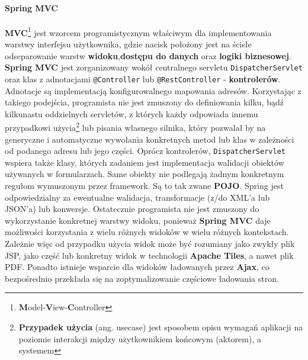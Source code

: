 	\paragraph{Spring MVC}
	\label{app:spring_mvc}
	\textbf{MVC}\footnote{\textbf{M}odel-\textbf{V}iew-\textbf{C}ontroller} jest wzorcem programistycznym 
	właściwym dla implementowania warstwy interfejsu użytkownika, gdzie nacisk położony 
	jest na ścisłe odseparowanie warstw \textbf{widoku},\textbf{dostępu do danych} oraz 
	\textbf{logiki biznesowej}. \textbf{Spring MVC} jest zorganizowany wokół 
	centralnego servletu \texttt{DispatcherServlet} oraz klas z adnotacjami 
	\texttt{@Controller} lub \texttt{@RestController} - \textbf{kontrolerów}. 
	Adnotacje są implementacją konfigurowalnego mapowania adresów. Korzystając 
	z takiego podejścia, programista nie jest zmuszony do definiowania kilku, 
	bądź kilkunastu oddzielnych servletów, z których każdy odpowiada innemu 
	przypadkowi użycia\footnote{\textbf{Przypadek użycia} (ang. usecase) jest sposobem 
	opisu wymagań aplikacji na poziomie interakcji między użytkownikiem końcowym 
	(aktorem), a systemem} lub pisania własnego silnika, który pozwalał by na generyczne 
	i automatyczne wywołania konkretnych metod lub klas w zależności od podanego adresu lub jego części. 
	Oprócz kontrolerów, \texttt{DispatcherServlet} wspiera także klasy, których 
	zadaniem jest implementacja walidacji obiektów używanych w formularzach. 
	Same obiekty nie podlegają żadnym konkretnym regułom wymuszonym przez framework. 
	Są to tak zwane \textbf{POJO}. Spring jest odpowiedzialny za ewentualne walidacja, transformacje (z/do XML'a lub JSON'a) lub konwersje. 
	Ostatecznie programista nie jest zmuszony do wykorzystanie konkretnej warstwy 
	widoku, ponieważ \textbf{Spring MVC} daje możliwości korzystania z wielu 
	różnych widoków w wielu różnych kontekstach. Zależnie więc od przypadku użycia widok 
	może być rozumiany jako zwykły plik JSP, jako część lub konkretny widok w technologii 
	\textbf{Apache Tiles}, a nawet plik PDF. Ponadto istnieje wsparcie dla widoków 
	ładowanych przez \textbf{Ajax}, co bezpośrednio przekłada się na zoptymalizowanie częściowe ładowania stron.

